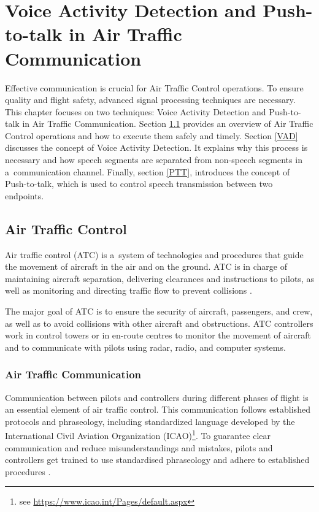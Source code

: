 
\chapter{Voice Activity Detection and Push-to-talk in Air Traffic Communication}\label{Literature}

Effective communication is crucial for Air Traffic Control operations. To ensure quality and flight safety, advanced signal processing techniques are necessary.
This chapter focuses on two techniques: Voice Activity Detection and Push-to-talk in Air Traffic Communication. Section \ref{ATCon} provides an overview of Air Traffic Control operations and how to execute them safely and timely. 
Section \ref{VAD} discusses the concept of Voice Activity Detection. It explains why this process is necessary and how speech segments are separated from non-speech segments in a~communication channel. 
Finally, section \ref{PTT}, introduces the concept of Push-to-talk, which is used to control speech transmission between two endpoints. 

\section{Air Traffic Control}\label{ATCon}

Air traffic control (ATC) is a~system of technologies and procedures that guide the movement of aircraft in the air and on the ground. ATC is in charge of maintaining aircraft separation, delivering clearances and instructions to pilots, as well as monitoring and directing traffic flow to prevent collisions \cite{CAA}.

The major goal of ATC is to ensure the security of aircraft, passengers, and crew, as well as to avoid collisions with other aircraft and obstructions.
ATC controllers work in control towers or in en-route centres to monitor the movement of aircraft and to communicate with pilots using radar, radio, and computer systems.

\subsection{Air Traffic Communication}\label{ATCom}

Communication between pilots and controllers during different phases of flight is an essential element of air traffic control. This communication follows established protocols and phraseology, including standardized language developed by the International Civil Aviation Organization (ICAO)\footnote{see \href{https://www.icao.int/Pages/default.aspx}{{\selectfont https://www.icao.int/Pages/default.aspx}}}. To guarantee clear communication and reduce misunderstandings and mistakes, pilots and controllers get trained to use standardised phraseology and adhere to established procedures \cite[ch. 1, pp. 18-19]{ATM:2017}.



